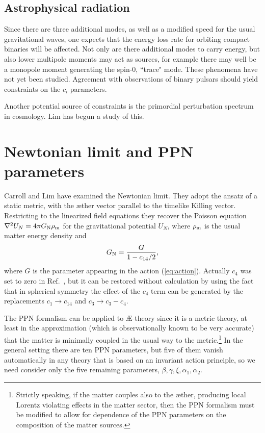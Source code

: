 \documentclass[aps]{ws-procs9x6}
\def\beq{\begin{equation}}
\def\eeq{\end{equation}}
\def\a{\alpha}
\begin{document}
\subsection{Astrophysical radiation}

Since there are three additional modes, as well as
a modified speed for the usual gravitational waves,
one expects that the energy loss rate for orbiting
compact binaries will be affected. Not only are there
additional modes to carry energy, but also lower
multipole moments may act as sources, for example
there may well be a monopole moment generating the
spin-0, ``trace" mode. These phenomena
have not yet been studied.
Agreement with observations
of binary pulsars should yield constraints on the
$c_i$ parameters.

Another potential source of constraints is the
primordial perturbation spectrum in cosmology.
Lim\cite{Lim} has begun a study of this.

\section{Newtonian limit and PPN parameters}
\label{PPN}

Carroll and Lim\cite{CLim} have examined the Newtonian limit.
They adopt the ansatz of a static metric,
with the {\ae}ther vector parallel to the timelike Killing
vector. Restricting to the linearized field equations they
recover the Poisson equation $\nabla^2 U_N = 4\pi G_{\rm N}
\rho_{\rm m}$ for the gravitational potential $U_N$, where
$\rho_{\rm m}$ is the usual matter energy density and
%
\beq
G_{\rm N} = \frac{G}{1-c_{14}/2},
\label{GNewton}
\eeq
%
where $G$ is the
parameter appearing in the action (\ref{eq:action}).
Actually $c_4$ was set to zero in Ref.~,
but it can be restored without calculation by using
the fact\cite{ElingJ1} that in spherical symmetry
the effect of the $c_4$ term can be generated
by the replacements
$c_1\rightarrow c_{14}$ and $c_3\rightarrow c_3-c_4$.

The PPN formalism\cite{WillBook,WillReview} can be applied to
\AE-theory since it is a metric theory, at least in the
approximation (which is observationally known to be very
accurate) that the matter is minimally coupled in the usual way
to the metric.\footnote{Strictly speaking, if the matter couples
also to the {\ae}ther, producing local Lorentz violating effects
in the matter sector, then the PPN formalism must be modified to
allow for dependence of the PPN parameters on the composition of
the matter sources.} In the general setting there are ten PPN
parameters, but five of them vanish automatically in any theory
that is based on an invariant action principle, so we need
consider only the five remaining parameters,
$\beta,\gamma,\xi,\a_1,\a_2$.
\end{document}
